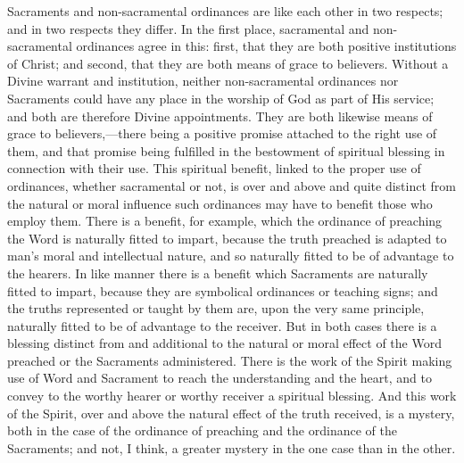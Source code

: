 \documentclass[]{book}
\begin{document}
Sacraments and non-sacramental ordinances are like each other in two respects; and in two respects they differ. In the first place, sacramental and non-sacramental ordinances agree in this: first, that they are both positive institutions of Christ; and second, that they are both means of grace to believers. Without a Divine warrant and institution, neither non-sacramental ordinances nor Sacraments could have any place in the worship of God as part of His service; and both are therefore Divine appointments. They are both likewise means of grace to believers,---there being a positive promise attached to the right use of them, and that promise being fulfilled in the bestowment of spiritual blessing in connection with their use. This spiritual benefit, linked to the proper use of ordinances, whether sacramental or not, is over and above and quite distinct from the natural or moral influence such ordinances may have to benefit those who employ them. There is a benefit, for example, which the ordinance of preaching the Word is naturally fitted to impart, because the truth preached is adapted to man's moral and intellectual nature, and so naturally fitted to be of advantage to the hearers. In like manner there is a benefit which Sacraments are naturally fitted to impart, because they are symbolical ordinances or teaching signs; and the truths represented or taught by them are, upon the very same principle, naturally fitted to be of advantage to the receiver. But in both cases there is a blessing distinct from and additional to the natural or moral effect of the Word preached or the Sacraments administered. There is the work of the Spirit making use of Word and Sacrament to reach the understanding and the heart, and to convey to the worthy hearer or worthy receiver a spiritual blessing. And this work of the Spirit, over and above the natural effect of the truth received, is a mystery, both in the case of the ordinance of preaching and the ordinance of the Sacraments; and not, I think, a greater mystery in the one case than in the other.
\end{document}
